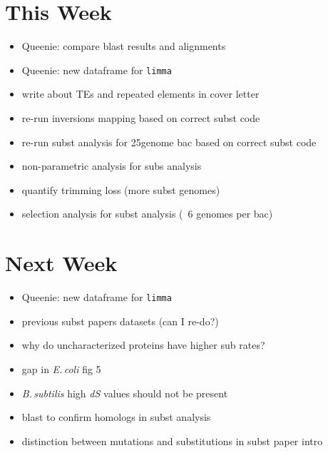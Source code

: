 \documentclass[12pt]{article}
\newcommand{\bass}{\textit{B.\,subtilis}\xspace}
\newcommand{\ecol}{\textit{E.\,coli}\xspace}
\newcommand{\ds}{\textit{dS}\xspace}
\begin{document}

\section*{This Week}
%
\begin{itemize}
	\item Queenie: compare blast results and alignments
	\item Queenie: new dataframe for \texttt{limma}
\item write about TEs and repeated elements in cover letter
\item re-run inversions mapping based on correct subst code
\item re-run subst analysis for 25genome bac based on correct subst code
\item non-parametric analysis for subs analysis
\item quantify trimming loss (more subst genomes)
\item selection analysis for subst analysis (~6 genomes per bac)

\end{itemize}


\section*{Next Week}
\begin{itemize}
	\item Queenie: new dataframe for \texttt{limma}
	\item previous subst papers datasets (can I re-do?)
	\item why do uncharacterized proteins have higher sub rates?
	\item gap in \ecol fig 5
	\item \bass high \ds values should not be present
	\item blast to confirm homologs in subst analysis
	\item distinction between mutations and substitutions in subst paper intro
\end{itemize}
\end{document}
